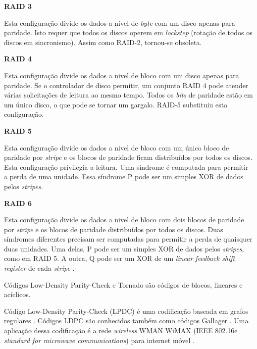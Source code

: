 {\bf RAID 3}

\vspace{0.5cm}

Esta configuração divide os dados a nivel de \emph{byte} com um disco apenas para paridade. Isto requer que todos os discos operem em \emph{lockstep} (rotação de todos os discos em sincronismo). Assim como RAID-2, tornou-se obsoleta.

\vspace{1cm}

{\bf RAID 4}

\vspace{0.5cm}

Esta configuração divide os dados a nivel de bloco com um disco apenas para paridade. Se o controlador de disco permitir, um conjunto RAID 4 pode atender várias solicitações de leitura ao mesmo tempo. Todos os \emph{bits} de paridade estão em um único disco, o que pode se tornar um gargalo. RAID-5 substituiu esta configuração.

\vspace{1cm}

{\bf RAID 5}

\vspace{0.5cm}

Esta configuração divide os dados a nivel de bloco com um único bloco de paridade por \emph{stripe} e os blocos de paridade ficam distribuídos por todos os discos. Esta configuração privilegia a leitura. Uma síndrome é computada para permitir a perda de uma unidade. Essa síndrome P pode ser um simples XOR de dados pelos \emph{stripes}.

\vspace{1cm}

{\bf RAID 6}

\vspace{0.5cm}

Esta configuração divide os dados a nivel de bloco com dois blocos de paridade por \emph{stripe} e os blocos de paridade distribuídos por todos os discos. Duas síndromes diferentes precisam ser computadas para permitir a perda de quaisquer duas unidades. Uma delas, P pode ser um simples XOR de dados pelos \emph{stripes}, como em RAID 5. A outra, Q pode ser um XOR de um \emph{linear feedback shift register} de cada \emph{stripe} \cite{Anvin:2009}.

Códigos Low-Density Parity-Check e Tornado são códigos de blocos, lineares e acíclicos. 

Código Low-Density Parity-Check (LPDC) é  uma codificação baseada em grafos regulares \cite{Gallager:1963}. Códigos LDPC são conhecidos também como códigos Gallager \cite{LDPCC:2010}. Uma aplicação dessa codificação é a rede \emph{wireless} WMAN WiMAX (IEEE 802.16e \emph{standard for microwave communications}) para internet móvel \cite{wimax:2010}.


